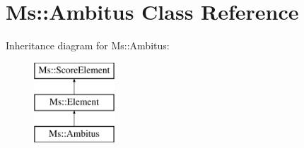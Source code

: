 \hypertarget{class_ms_1_1_ambitus}{}\section{Ms\+:\+:Ambitus Class Reference}
\label{class_ms_1_1_ambitus}
Inheritance diagram for Ms\+:\+:Ambitus\+:\begin{figure}[H]
\begin{center}
\leavevmode
\includegraphics[height=3.000000cm]{class_ms_1_1_ambitus}
\end{center}
\end{figure}
